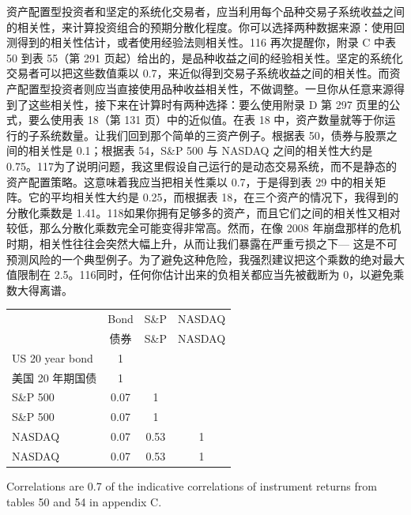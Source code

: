 \begin{chineseblock}资产配置型投资者和坚定的系统化交易者，应当利用每个品种交易子系统收益之间的相关性，来计算投资组合的预期分散化程度。你可以选择两种数据来源：使用回测得到的相关性估计，或者使用经验法则相关性。116 再次提醒你，附录 C 中表 50 到表 55（第 291 页起）给出的，是品种收益之间的经验相关性。坚定的系统化交易者可以把这些数值乘以 0.7，来近似得到交易子系统收益之间的相关性。而资产配置型投资者则应当直接使用品种收益相关性，不做调整。一旦你从任意来源得到了这些相关性，接下来在计算时有两种选择：要么使用附录 D 第 297 页里的公式，要么使用表 18（第 131 页）中的近似值。在表 18 中，资产数量就等于你运行的子系统数量。让我们回到那个简单的三资产例子。根据表 50，债券与股票之间的相关性是 0.1；根据表 54，S\&P 500 与 NASDAQ 之间的相关性大约是 0.75。117为了说明问题，我这里假设自己运行的是动态交易系统，而不是静态的资产配置策略。这意味着我应当把相关性乘以 0.7，于是得到表 29 中的相关矩阵。它的平均相关性大约是 0.25，而根据表 18，在三个资产的情况下，我得到的分散化乘数是 1.41。118如果你拥有足够多的资产，而且它们之间的相关性又相对较低，那么分散化乘数完全可能变得非常高。然而，在像 2008 年崩盘那样的危机时期，相关性往往会突然大幅上升，从而让我们暴露在严重亏损之下--- 这是不可预测风险的一个典型例子。为了避免这种危险，我强烈建议把这个乘数的绝对最大值限制在 2.5。116同时，任何你估计出来的负相关都应当先被截断为 0，以避免乘数大得离谱。\end{chineseblock}

\begin{bilingualtableblock} \begingroup \small \centering \begin{tabular}{@{} lccc@{}}
\toprule
& Bond & S\&P & NASDAQ \\
& 债券 & S\&P & NASDAQ \\
\midrule
US 20 year bond & 1 & & \\
美国 20 年期国债 & 1 & & \\
S\&P 500 & 0.07 & 1 & \\
S\&P 500 & 0.07 & 1 & \\
NASDAQ & 0.07 & 0.53 & 1 \\
NASDAQ & 0.07 & 0.53 & 1 \\
\bottomrule
\end{tabular}
\par \endgroup \end{bilingualtableblock}

\begin{englishblock} Correlations are 0.7 of the indicative correlations of instrument returns from tables 50 and 54 in appendix C. \end{englishblock}

